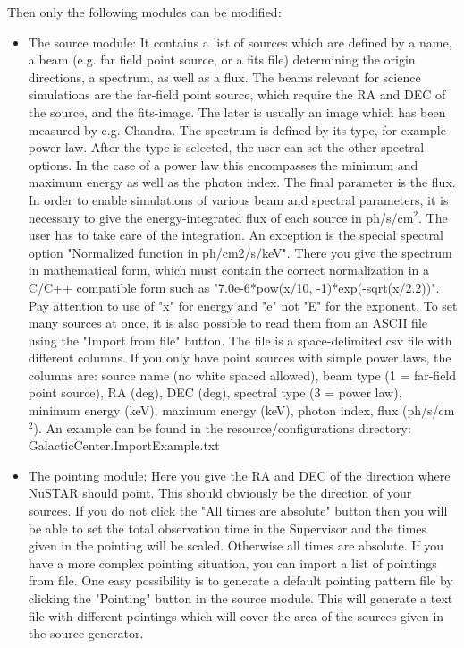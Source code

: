 \documentclass[11pt]{article}
\begin{document}
Then only the following modules can be modified:
\begin{itemize}
\item The source module: 
It contains a list of sources which are defined by a name, a beam (e.g. far field point source, or a fits file) determining the origin directions, a spectrum, as well as a flux.
The beams relevant for science simulations are the far-field point source, which require the RA and DEC of the source, and the fits-image. The later is usually an image which has been measured by e.g. Chandra.
The spectrum is defined by its type, for example power law. 
After the type is selected, the user can set the other spectral options.
In the case of a power law this encompasses the minimum and maximum energy as well as the photon index.
The final parameter is the flux.
In order to enable simulations of various beam and spectral parameters, it is necessary to give the energy-integrated flux of each source in ph/s/cm$^2$. 
The user has to take care of the integration.
An exception is the special spectral option "Normalized function in ph/cm2/s/keV". 
There you give the spectrum in mathematical form, which must contain the correct normalization in a C/C++ compatible form such as "7.0e-6*pow(x/10, -1)*exp(-sqrt(x/2.2))".
Pay attention to use of "x" for energy and "e" not "E" for the exponent.
To set many sources at once, it is also possible to read them from an ASCII file using the "Import from file" button. 
The file is a space-delimited csv file with different columns. If you only have point sources with simple power laws, the columns are: source name (no white spaced allowed), beam type (1 = far-field point source), RA (deg), DEC (deg), spectral type (3 = power law), minimum energy (keV), maximum energy (keV), photon index, flux (ph/s/cm$^2$).
An example can be found in the resource/configurations directory: GalacticCenter.ImportExample.txt
\item The pointing module: 
Here you give the RA and DEC of the direction where NuSTAR should point. 
This should obviously be the direction of your sources.
If you do not click the "All times are absolute" button then you will be able to set the total observation time in the Supervisor and the times given in the pointing will be scaled.
Otherwise all times are absolute. 
If you have a more complex pointing situation, you can import a list of pointings from file.
One easy possibility is to generate a default pointing pattern file by clicking the "Pointing" button in the source module. 
This will generate a text file with different pointings which will cover the area of the sources given in the source generator.

\end{itemize}
\end{document}

